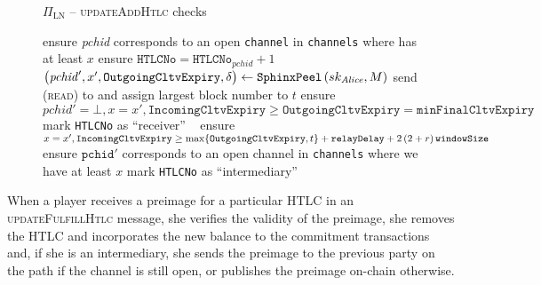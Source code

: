   \begin{figure}[H]
    \begin{protocolbox}{$\Pi_{\mathrm{LN}}$ -- \textsc{updateAddHtlc} checks}
      \begin{algorithmic}[1]
        \State ensure \textit{pchid} corresponds to an open \texttt{channel}
        in \texttt{channels} where \bob{} has at least $x$
        \State ensure $\mathtt{HTLCNo} = \mathtt{HTLCNo}_{\mathit{pchid}} + 1$
        \State $\left(\mathit{pchid}', x', \mathtt{OutgoingCltvExpiry},
        \delta\right) \gets \mathtt{SphinxPeel}\left(sk_{\mathit{Alice}}, M\right)$
        \State send (\textsc{read}) to \ledger{} and assign largest block
        number to $t$
          \State ensure $\mathit{pchid}' = \bot, x = x',
          \mathtt{IncomingCltvExpiry} \geq \mathtt{OutgoingCltvExpiry} =
          \mathtt{minFinalCltvExpiry}$
          \State mark \texttt{HTLCNo} as ``receiver''
        \Else \ 
          \State ensure $x = x', \mathtt{IncomingCltvExpiry} \geq
          \max\{\mathtt{OutgoingCltvExpiry}, t\} + \mathtt{relayDelay} +
          2\left(2 + r\right)\texttt{windowSize}{}$
          \label{alg:protocol:pay:updateAddHtlc:slack}
          \State ensure $\mathtt{pchid}'$ corresponds to an open channel in
          \texttt{channels} where we have at least $x$
          \State mark \texttt{HTLCNo} as ``intermediary''
        \EndIf
      \end{algorithmic}
    \end{protocolbox}
    \caption{}
    \label{alg:protocol:pay:updateAddHtlc:checks}
  \end{figure}

  When a player receives a preimage for a particular HTLC in an
  \textsc{updateFulfillHtlc} message, she verifies the validity of the preimage,
  she removes the HTLC and incorporates the new balance to the commitment
  transactions and, if she is an intermediary, she sends the preimage to the
  previous party on the path if the channel is still open, or publishes the
  preimage on-chain otherwise.


